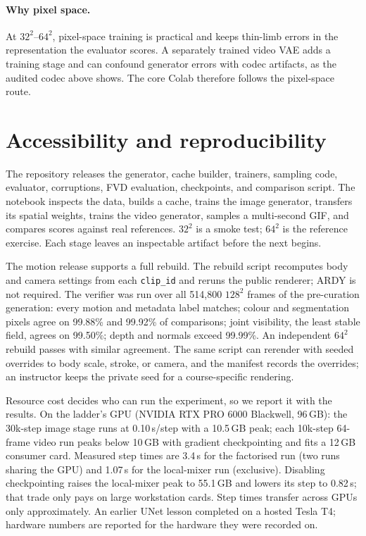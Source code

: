\documentclass[11pt]{article}
\begin{document}
\paragraph{Why pixel space.} At $32^2$--$64^2$, pixel-space training is practical and keeps thin-limb errors in
the representation the evaluator scores. A separately trained video VAE adds a training stage and can confound
generator errors with codec artifacts, as the audited codec above shows. The core Colab therefore follows the
pixel-space route.

\section{Accessibility and reproducibility}\label{sec:access}
The repository releases the generator, cache builder, trainers, sampling code, evaluator, corruptions, FVD
evaluation, checkpoints, and comparison script. The notebook inspects the data, builds a cache, trains the
image generator, transfers its spatial weights, trains the video generator, samples a multi-second GIF, and
compares scores against real references. $32^2$ is a smoke test; $64^2$ is the reference exercise. Each stage
leaves an inspectable artifact before the next begins.

The motion release supports a full rebuild. The rebuild script recomputes body and camera settings from each
\texttt{clip\_id} and reruns the public renderer; ARDY is not required. The verifier was run over all 514,800
$128^2$ frames of the pre-curation generation: every motion and metadata label matches; colour and segmentation
pixels agree on 99.88\% and 99.92\% of comparisons; joint visibility, the least stable field, agrees on
99.50\%; depth and normals exceed 99.99\%. An independent $64^2$ rebuild passes with similar agreement. The
same script can rerender with seeded overrides to body scale, stroke, or camera, and the manifest records the
overrides; an instructor keeps the private seed for a course-specific rendering.

Resource cost decides who can run the experiment, so we report it with the results. On the ladder's GPU
(NVIDIA RTX PRO 6000 Blackwell, 96\,GB): the 30k-step image stage runs at 0.10\,s/step with a 10.5\,GB peak;
each 10k-step 64-frame video run peaks below 10\,GB with gradient checkpointing and fits a 12\,GB consumer
card. Measured step times are 3.4\,s for the factorised run (two runs sharing the GPU) and 1.07\,s for the
local-mixer run (exclusive). Disabling checkpointing raises the local-mixer peak to 55.1\,GB and lowers its
step to 0.82\,s; that trade only pays on large workstation cards. Step times transfer across GPUs only
approximately. An earlier UNet lesson completed on a hosted Tesla T4; hardware numbers are reported for the
hardware they were recorded on.
\end{document}
